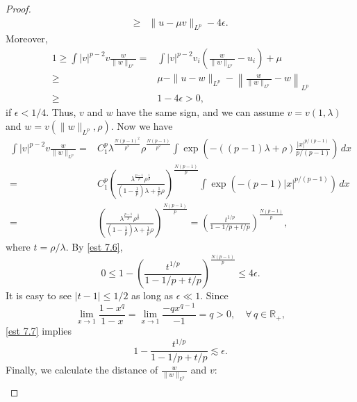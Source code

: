 \documentclass[10pt,a4paper]{amsart}
\newcommand{\R}{\mathbb{R}}
\begin{document}
\begin{proof}
\begin{equation}
\begin{split}
            \ge{}& \|u-\mu v\|_{L^p} - 4\epsilon.
        \end{split}
    \end{equation}
    Moreover,
    \begin{equation}\label{est 7.6}
        \begin{aligned}
            1 \ge \int |v|^{p-2}v\frac{w}{\|w\|_{L^p}} ={}& \int |v|^{p-2}v_i\left(\frac{w}{\|w\|_{L^p}}-u_i\right) + \mu\\
            \ge{}& \mu - \|u-w\|_{L^p} - \left\|\frac{w}{\|w\|_{L^p}}-w\right\|_{L^p}\\
            \ge{}& 1-4\epsilon > 0,
        \end{aligned}
    \end{equation}
    if $\epsilon<1/4$. Thus, $v$ and $w$ have the same sign, and we can assume $v=v(1,\lambda)$ and $w = v(\|w\|_{L^p},\rho)$. Now we have
    \begin{align*}
        \int |v|^{p-2}v\frac{w}{\|w\|_{L^p}} ={}& C_1^p \lambda^{\frac{N(p-1)^2}{p^2}}\rho^{\frac{N(p-1)}{p^2}}\int \exp\left(-((p-1)\lambda+\rho)\frac{|x|^{p/(p-1)}}{p/(p-1)}\right) \,dx\\
        ={}& C_1^p \left(\frac{\lambda^{\frac{p-1}{p}}\rho^{\frac 1p}}{(1-\frac 1p)\lambda + \frac 1p \rho}\right)^{\frac{N(p-1)}{p}} \int \exp\left(-(p-1)|x|^{p/(p-1)}\right)\,dx \\
        ={}& \left(\frac{\lambda^{\frac{p-1}{p}}\rho^{\frac 1p}}{(1-\frac 1p)\lambda + \frac 1p \rho}\right)^{\frac{N(p-1)}{p}} = \left(\frac{t^{1/p}}{1-1/p + t/p}\right)^{\frac{N(p-1)}{p}},
    \end{align*}
    where $t = \rho/\lambda$. By \eqref{est 7.6},
    \begin{equation}\label{est 7.7}
        0 \le 1 - \left(\frac{t^{1/p}}{1-1/p + t/p}\right)^{\frac{N(p-1)}{p}} \le 4\epsilon.
    \end{equation}
    It is easy to see $|t-1|\le 1/2$ as long as $\epsilon \ll 1$. Since
    \begin{equation*}
        \lim_{x\to 1} \frac{1-x^q}{1-x} = \lim_{x\to 1} \frac{-qx^{q-1}}{-1} = q>0,\quad \forall\, q\in \R_+,
    \end{equation*}
    \eqref{est 7.7} implies
    \begin{equation}\label{est 7.8}
        1- \frac{t^{1/p}}{1-1/p + t/p} \lesssim \epsilon.
    \end{equation}
    Finally, we calculate the distance of $\frac{w}{\|w\|_{L^p}}$ and $v$:
    \begin{align*}

\end{align*}
\end{proof}
\end{document}
